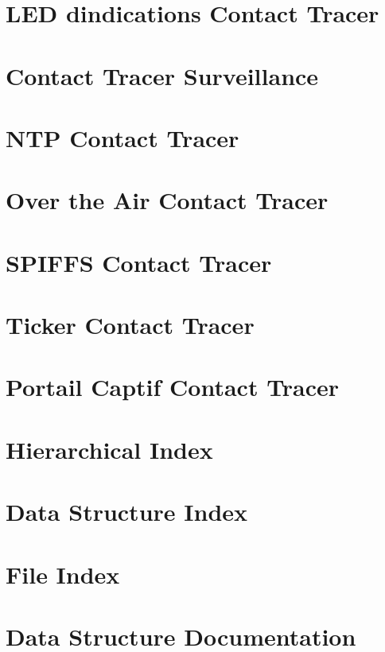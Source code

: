 \documentclass[twoside]{book}
\newcommand{\+}{\discretionary{\mbox{\scriptsize$\hookleftarrow$}}{}{}}
\begin{document}
\chapter{LED d\textquotesingle{}indications Contact Tracer}
\label{_c_t_l_e_d}

\chapter{Contact Tracer Surveillance}
\label{_c_t_monitoring}

\chapter{NTP Contact Tracer}
\label{_c_t_n_t_p}

\chapter{Over the Air Contact Tracer}
\label{_c_t_o_t_a}

\chapter{SPIFFS Contact Tracer}
\label{_c_t_s_p_i_f_f_s}

\chapter{Ticker Contact Tracer}
\label{_c_t_ticker}

\chapter{Portail Captif Contact Tracer}
\label{_c_t_web_server}

\chapter{Hierarchical Index}

\chapter{Data Structure Index}

\chapter{File Index}

\chapter{Data Structure Documentation}

\end{document}
